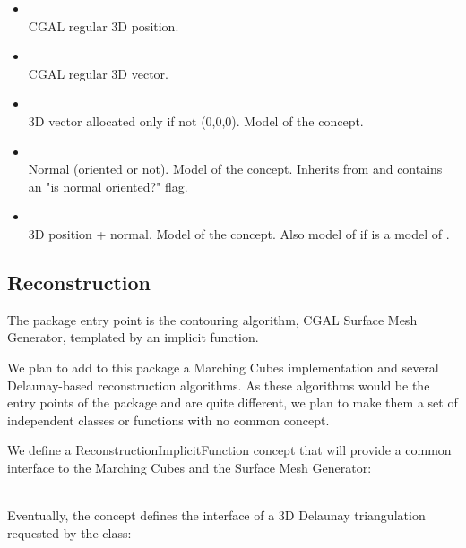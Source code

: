 \begin{itemize}
\item {} \\
CGAL regular 3D position.
\item {} \\
CGAL regular 3D vector.
\item {} \\
3D vector allocated only if not (0,0,0).
Model of the  concept.
\item {} \\
Normal (oriented or not).
Model of the  concept.
Inherits from  and contains an "is normal oriented?" flag.
\item {} \\
3D position + normal.
Model of the  concept.
Also model of  if  is a model of .
\end{itemize}


\subsection{Reconstruction}

The package entry point is the contouring algorithm, CGAL Surface Mesh Generator,
templated by an implicit function.

We plan to add to this package a Marching Cubes implementation and
several Delaunay-based reconstruction algorithms.
As these algorithms would be the entry points of the package and are quite
different, we plan to make them a set of independent classes or functions
with no common concept.

We define a ReconstructionImplicitFunction concept that will provide
a common interface to the Marching Cubes and the Surface Mesh Generator:

  \\

Eventually, the  concept defines the interface of a 3D Delaunay triangulation requested by the  class:

  \\


